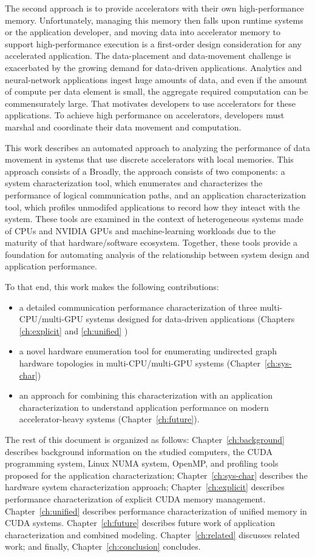 The second approach is to provide accelerators with their own high-performance memory.
Unfortunately, managing this memory then falls upon runtime systems or the application developer, and moving data into accelerator memory to support high-performance execution is a first-order design consideration for any accelerated application.
The data-placement and data-movement challenge is exacerbated by the growing demand for data-driven applications.
Analytics and neural-network applications ingest huge amounts of data, and even if the amount of compute per data element is small, the aggregate required computation can be commensurately large.
That motivates developers to use accelerators for these applications.
To achieve high performance on accelerators, developers must marshal and coordinate their data movement and computation.

This work describes an automated approach to analyzing the performance of data movement in systems that use discrete accelerators with local memories.
This approach consists of a
Broadly, the approach consists of two components: a system characterization tool, which enumerates and characterizes the performance of logical communication paths, and an application characterization tool, which profiles unmodifed applications to record how they inteact with the system.
These tools are examined in the context of heterogeneous systems made of CPUs and NVIDIA GPUs and machine-learning workloads due to the maturity of that hardware/software ecosystem.
Together, these tools provide a foundation for automating analysis of the relationship between system design and application performance.

To that end, this work makes the following contributions:
\begin{itemize}
 \item a detailed communication performance characterization of three multi-CPU/multi-GPU systems designed for data-driven applications (Chapters \ref{ch:explicit} and \ref{ch:unified} )
 \item a novel hardware enumeration tool for enumerating undirected graph hardware topologies in multi-CPU/multi-GPU systems (Chapter~\ref{ch:sys-char})
 \item an approach for combining this characterization with an application characterization to understand application performance on modern accelerator-heavy systems (Chapter~\ref{ch:future}).
\end{itemize}

The rest of this document is organized as follows:
Chapter~\ref{ch:background} describes background information on the studied computers, the CUDA programming system, Linux NUMA system, OpenMP, and profiling tools proposed for the application characterization;
Chapter~\ref{ch:sys-char} describes the hardware system characterization approach;
Chapter~\ref{ch:explicit} describes performance characterization of explicit CUDA memory management.
Chapter~\ref{ch:unified} describes performance characterization of unified memory in CUDA systems.
Chapter~\ref{ch:future} describes future work of application characterization and combined modeling.
Chapter~\ref{ch:related} discusses related work;
and finally, Chapter~\ref{ch:conclusion} concludes.